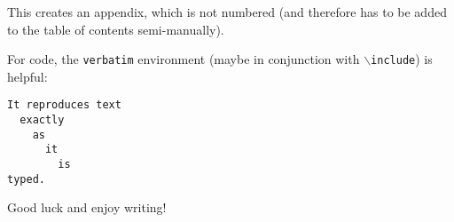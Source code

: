 


This creates an appendix, which is not numbered (and therefore has to be added to the table of contents semi-manually).

For code, the {\tt verbatim} environment (maybe in conjunction with $\backslash${\tt include}) is helpful:

\begin{verbatim}
It reproduces text
  exactly
    as
      it
        is
typed.
\end{verbatim}

Good luck and enjoy writing!


